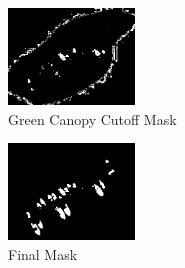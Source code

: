 \documentclass[12pt]{article}
\begin{document}
\begin{figure}
\centering
\includegraphics[width=0.30\textwidth]{mask_green_canopy.png}
\caption{Green Canopy Cutoff Mask}
\label{maskgreencanopy}
\end{figure}

\begin{figure}
\centering
\includegraphics[width=0.30\textwidth]{mask_almost_final.png}
\caption{Final Mask}
\label{maskalmostfinal}
\end{figure}
\end{document}
